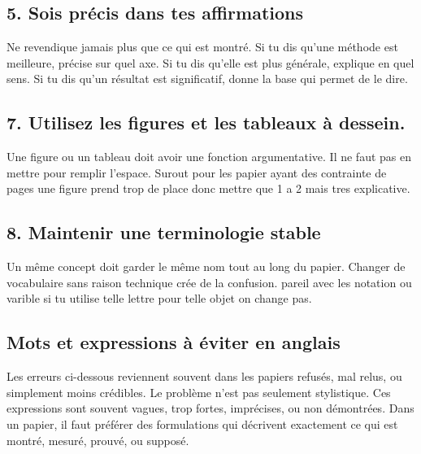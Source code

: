 \documentclass[11pt,a4paper]{article}
\theoremstyle{definition}
\begin{document}
\subsection*{5. Sois précis dans tes affirmations}

Ne revendique jamais plus que ce qui est montré. Si tu dis qu'une méthode est meilleure, précise sur quel axe. Si tu dis qu'elle est plus générale, explique en quel sens. Si tu dis qu'un résultat est significatif, donne la base qui permet de le dire.

\subsection*{7. Utilisez les figures et les tableaux à dessein.}

Une figure ou un tableau doit avoir une fonction argumentative. Il ne faut pas en mettre pour remplir l'espace. Surout pour les papier ayant des contrainte de pages une figure prend trop de place donc mettre que 1 a 2 mais tres explicative.

\subsection*{8. Maintenir une terminologie stable}

Un même concept doit garder le même nom tout au long du papier. Changer de vocabulaire sans raison technique crée de la confusion. pareil avec les notation ou varible si tu utilise telle lettre pour telle objet on change pas.


\subsection*{Mots et expressions à éviter en anglais}

Les erreurs ci-dessous reviennent souvent dans les papiers refusés, mal relus, ou simplement moins crédibles.
Le problème n'est pas seulement stylistique. Ces expressions sont souvent vagues, trop fortes,
imprécises, ou non démontrées. Dans un papier, il faut préférer des formulations qui décrivent
exactement ce qui est montré, mesuré, prouvé, ou supposé.
\end{document}
